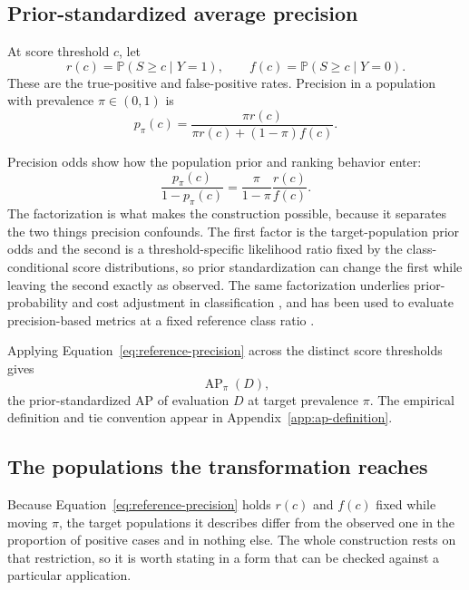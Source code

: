 \documentclass[11pt]{article}
\newcommand{\AP}{\operatorname{AP}}
\newcommand{\Prb}{\mathbb{P}}
\theoremstyle{remark}
\begin{document}
\subsection{Prior-standardized average precision}

At score threshold $c$, let
\[
r(c)=\Prb(S\geq c\mid Y=1),
\qquad
f(c)=\Prb(S\geq c\mid Y=0).
\]
These are the true-positive and false-positive rates. Precision in a population with prevalence $\pi\in(0,1)$ is
\begin{equation}
p_\pi(c)
=
\frac{\pi r(c)}
{\pi r(c)+(1-\pi)f(c)}.
\label{eq:reference-precision}
\end{equation}

Precision odds show how the population prior and ranking behavior enter:
\begin{equation}
\frac{p_\pi(c)}{1-p_\pi(c)}
=
\frac{\pi}{1-\pi}
\frac{r(c)}{f(c)}.
\label{eq:precision-odds}
\end{equation}
The factorization is what makes the construction possible, because it separates the two things precision confounds. The first factor is the target-population prior odds and the second is a threshold-specific likelihood ratio fixed by the class-conditional score distributions, so prior standardization can change the first while leaving the second exactly as observed. The same factorization underlies prior-probability and cost adjustment in classification \cite{elkan2001foundations}, and has been used to evaluate precision-based metrics at a fixed reference class ratio \cite{siblini2020calibration,degeest2016online}.

Applying Equation~\eqref{eq:reference-precision} across the distinct score thresholds gives
\[
\AP_\pi(D),
\]
the prior-standardized AP of evaluation $D$ at target prevalence $\pi$. The empirical definition and tie convention appear in Appendix~\ref{app:ap-definition}.

\subsection{The populations the transformation reaches}
\label{sec:transport}

Because Equation~\eqref{eq:reference-precision} holds $r(c)$ and $f(c)$ fixed while moving $\pi$, the target populations it describes differ from the observed one in the proportion of positive cases and in nothing else. The whole construction rests on that restriction, so it is worth stating in a form that can be checked against a particular application.
\end{document}
